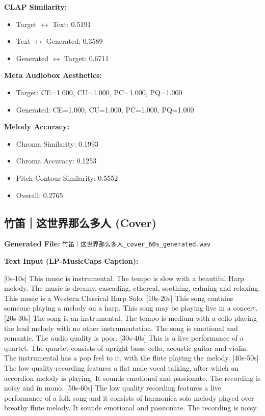 \documentclass{article}
\begin{document}
\textbf{CLAP Similarity:}
\begin{itemize}
    \item Target $\leftrightarrow$ Text: 0.5191
    \item Text $\leftrightarrow$ Generated: 0.3589
    \item Generated $\leftrightarrow$ Target: 0.6711
\end{itemize}

\textbf{Meta Audiobox Aesthetics:}
\begin{itemize}
    \item Target: CE=1.000, CU=1.000, PC=1.000, PQ=1.000
    \item Generated: CE=1.000, CU=1.000, PC=1.000, PQ=1.000
\end{itemize}

\textbf{Melody Accuracy:}
\begin{itemize}
    \item Chroma Similarity: 0.1993
    \item Chroma Accuracy: 0.1253
    \item Pitch Contour Similarity: 0.5552
    \item Overall: 0.2765
\end{itemize}

\subsection{竹笛｜这世界那么多人 (Cover)}

\textbf{Generated File:} \texttt{竹笛｜这世界那么多人\_cover\_60s\_generated.wav}

\textbf{Text Input (LP-MusicCaps Caption):}

\small
[0s-10s] This music is instrumental. The tempo is slow with a beautiful Harp melody. The music is dreamy, cascading, ethereal, soothing, calming and relaxing. This music is a Western Classical Harp Solo. [10s-20s] This song contains someone playing a melody on a harp. This song may be playing live in a concert. [20s-30s] The song is an instrumental. The tempo is medium with a cello playing the lead melody with no other instrumentation. The song is emotional and romantic. The audio quality is poor. [30s-40s] This is a live performance of a quartet. The quartet consists of upright bass, cello, acoustic guitar and violin. The instrumental has a pop feel to it, with the flute playing the melody. [40s-50s] The low quality recording features a flat male vocal talking, after which an accordion melody is playing. It sounds emotional and passionate. The recording is noisy and in mono. [50s-60s] The low quality recording features a live performance of a folk song and it consists of harmonica solo melody played over breathy flute melody. It sounds emotional and passionate. The recording is noisy.
\normalsize
\end{document}
